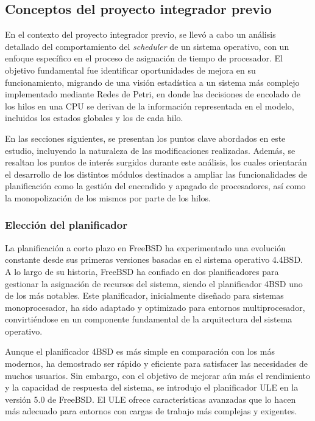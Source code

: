 \subsection{Conceptos del proyecto integrador previo}

En el contexto del proyecto integrador previo, se llevó a cabo un análisis detallado del comportamiento del \textit{scheduler} de un sistema operativo, con un enfoque específico en el proceso de asignación de tiempo de procesador. El objetivo fundamental fue identificar oportunidades de mejora en su funcionamiento, migrando de una visión estadística a un sistema más complejo implementado mediante Redes de Petri, en donde las decisiones de encolado de los hilos en una CPU se derivan de la información representada en el modelo, incluidos los estados globales y los de cada hilo.\par

En las secciones siguientes, se presentan los puntos clave abordados en este estudio, incluyendo la naturaleza de las modificaciones realizadas. Además, se resaltan los puntos de interés surgidos durante este análisis, los cuales orientarán el desarrollo de los distintos módulos destinados a ampliar las funcionalidades de planificación como la gestión del encendido y apagado de procesadores, así como la monopolización de los mismos por parte de los hilos.\par

\subsubsection{Elección del planificador}

La planificación a corto plazo en FreeBSD ha experimentado una evolución constante desde sus primeras versiones basadas en el sistema operativo 4.4BSD\cite{bib3}. A lo largo de su historia, FreeBSD ha confiado en dos planificadores para gestionar la asignación de recursos del sistema, siendo el planificador 4BSD uno de los más notables. Este planificador, inicialmente diseñado para sistemas monoprocesador, ha sido adaptado y optimizado para entornos multiprocesador, convirtiéndose en un componente fundamental de la arquitectura del sistema operativo.\par

Aunque el planificador 4BSD es más simple en comparación con los más modernos, ha demostrado ser rápido y eficiente para satisfacer las necesidades de muchos usuarios. Sin embargo, con el objetivo de mejorar aún más el rendimiento y la capacidad de respuesta del sistema, se introdujo el planificador ULE en la versión 5.0 de FreeBSD. El ULE ofrece características avanzadas que lo hacen más adecuado para entornos con cargas de trabajo más complejas y exigentes.\par

